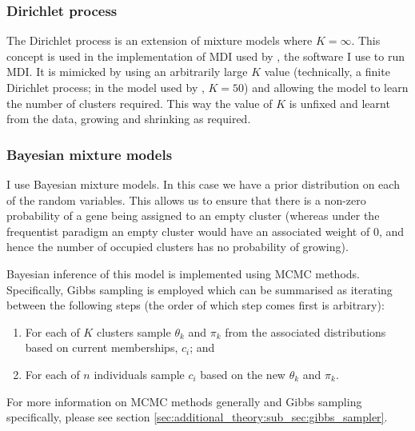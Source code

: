 \documentclass[12pt]{article} %
\begin{document}

	\subsubsection{Dirichlet process}
	The Dirichlet process is an extension of mixture models where $K = \infty$. This concept is used in the implementation of MDI used by \citet{MasonMDIGPUacceleratingintegrative2016a}, the software I use to run MDI. It is mimicked by using an arbitrarily large $K$ value (technically, a finite Dirichlet process; in the model used by \citet{MasonMDIGPUacceleratingintegrative2016a}, $K=50$) and allowing the model to learn the number of clusters required. This way the value of $K$ is unfixed and learnt from the data, growing and shrinking as required.
	
	\subsubsection{Bayesian mixture models}
	I use Bayesian mixture models. In this case we have a prior distribution on each of the random variables. This allows us to ensure that there is a non-zero probability of a gene being assigned to an empty cluster (whereas under the frequentist paradigm an empty cluster would have an associated weight of 0, and hence the number of occupied clusters has no probability of growing). 
	
	Bayesian inference of this model is implemented using MCMC methods. Specifically, Gibbs sampling is employed which can be summarised as iterating between the following steps (the order of which step comes first is arbitrary):
	\begin{enumerate}
		\item For each of $K$ clusters sample $\theta_k$ and $\pi_k$ from the associated distributions based on current memberships, $c_i$; and
		\item For each of $n$ individuals sample $c_i$ based on the new $\theta_k$ and $\pi_k$.
	\end{enumerate}
	For more information on MCMC methods generally and Gibbs sampling specifically, please see section \ref{sec:additional_theory:sub_sec:gibbs_sampler}.
	
\end{document}
